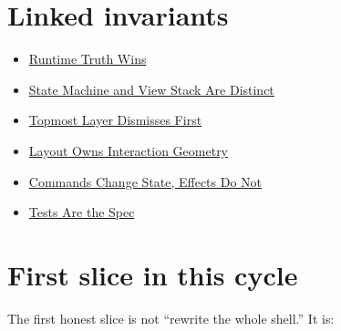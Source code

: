 \section{Linked invariants}\label{record-155-linked-invariants}

\begin{itemize}
\tightlist
\item
  \href{https://github.com/flyingrobots/bijou/blob/cbd70612140e7a450d764b3c7be1c6af878b99bc/docs/invariants/runtime-truth-wins.md}{Runtime Truth Wins}
\item
  \href{https://github.com/flyingrobots/bijou/blob/cbd70612140e7a450d764b3c7be1c6af878b99bc/docs/invariants/state-machine-and-view-stack-are-distinct.md}{State Machine and View Stack Are Distinct}
\item
  \href{https://github.com/flyingrobots/bijou/blob/cbd70612140e7a450d764b3c7be1c6af878b99bc/docs/invariants/topmost-layer-dismisses-first.md}{Topmost Layer Dismisses First}
\item
  \href{https://github.com/flyingrobots/bijou/blob/cbd70612140e7a450d764b3c7be1c6af878b99bc/docs/invariants/layout-owns-interaction-geometry.md}{Layout Owns Interaction Geometry}
\item
  \href{https://github.com/flyingrobots/bijou/blob/cbd70612140e7a450d764b3c7be1c6af878b99bc/docs/invariants/commands-change-state-effects-do-not.md}{Commands Change State, Effects Do Not}
\item
  \href{https://github.com/flyingrobots/bijou/blob/cbd70612140e7a450d764b3c7be1c6af878b99bc/docs/invariants/tests-are-the-spec.md}{Tests Are the Spec}
\end{itemize}

\section{First slice in this cycle}\label{record-155-first-slice-in-this-cycle}

The first honest slice is not ``rewrite the whole shell.'' It is:

